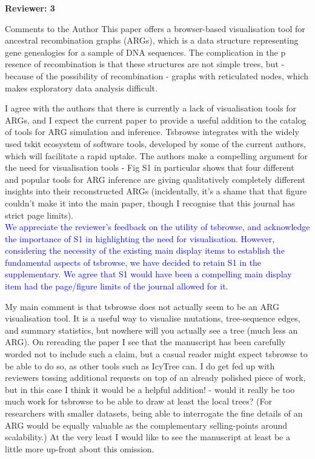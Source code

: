 \documentclass{article}
\begin{document}
\textbf{Reviewer: 3}

Comments to the Author
This paper offers a browser-based visualisation tool for ancestral recombination graphs (ARGs), which is 
a data structure representing gene genealogies for a sample of DNA sequences. The complication in the p
resence of recombination is that these structures are not simple trees, but - because of the possibility 
of recombination - graphs with reticulated nodes, which makes exploratory data analysis difficult.

I agree with the authors that there is currently a lack of visualisation tools for ARGs, and I expect the 
current paper to provide a useful addition to the catalog of tools for ARG simulation and inference. Tsbrowse 
integrates with the widely used tskit ecosystem of software tools, developed by some of the current authors, 
which will facilitate a rapid uptake. The authors make a compelling argument for the need for visualisation 
tools - Fig S1 in particular shows that four different and popular tools for ARG inference are giving 
qualitatively completely different insights into their reconstructed ARGs (incidentally, it's a shame that 
that figure couldn't make it into the main paper, though I recognise that this journal has strict page limits).\\
\textcolor{blue}{We appreciate the reviewer's feedback on the utility of tsbrowse, and acknowledge the 
importance of S1 in highlighting the need for visualisation. However, considering the necessity of the 
existing main display items to establish the fundamental aspects of tsbrowse, we have decided to retain S1 
in the supplementary. We agree that S1 would have been a compelling main display item had the page/figure 
limits of the journal allowed for it.}

My main comment is that tsbrowse does not actually seem to be an ARG visualisation tool. It is a useful way 
to visualise mutations, tree-sequence edges, and summary statistics, but nowhere will you actually see a tree 
(much less an ARG). On rereading the paper I see that the manuscript has been carefully worded not to include 
such a claim, but a casual reader might expect tsbrowse to be able to do so, as other tools such as IcyTree can. 
I do get fed up with reviewers tossing additional requests on top of an already polished piece of work, but 
in this case I think it would be a helpful addition! - would it really be too much work for tsbrowse to be 
able to draw at least the local trees? (For researchers with smaller datasets, being able to interrogate the 
fine details of an ARG would be equally valuable as the complementary selling-points around scalability.) At 
the very least I would like to see the manuscript at least be a little more up-front about this omission.\\
\end{document}
